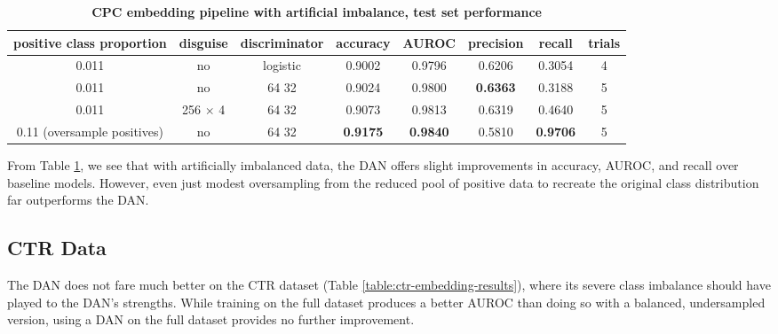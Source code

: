 \documentclass{proc}
\begin{document}
\begin{table}[]
\begin{center}
	\begin{tabular}{|c|c|c|c|c|c|c|c|}
		\hline
 		\textbf{positive class proportion} &  \textbf{disguise} & \textbf{discriminator} & \textbf{accuracy} & \textbf{AUROC} & \textbf{precision} & \textbf{recall} & \textbf{trials} \\ \hline
 		0.011 & no & logistic & 0.9002 & 0.9796 & 0.6206 & 0.3054 & 4\\ \hline
 		0.011 & no & 64 32 & 0.9024 & 0.9800 & \textbf{0.6363} & 0.3188 & 5 \\ \hline
 		0.011 & 256 $\times$ 4 & 64 32 & 0.9073 & 0.9813 & 0.6319 & 0.4640 & 5 \\ \hline
 		0.11 (oversample positives) & no & 64 32 & \textbf{0.9175} & \textbf{0.9840} & 0.5810 & \textbf{0.9706} & 5\\ \hline
	\end{tabular}
	\caption{\textbf{CPC embedding pipeline with artificial imbalance, test set performance}}
	\label{table:cpc-embedding-imbalanced-results}
\end{center}
\end{table}

From Table \ref{table:cpc-embedding-imbalanced-results}, we see that with artificially imbalanced data, the DAN offers slight improvements in accuracy, AUROC, and recall over baseline models. However, even just modest oversampling from the reduced pool of positive data to recreate the original class distribution far outperforms the DAN.

\subsection{CTR Data}

The DAN does not fare much better on the CTR dataset (Table \ref{table:ctr-embedding-results}), where its severe class imbalance should have played to the DAN's strengths. While training on the full dataset produces a better AUROC than doing so with a balanced, undersampled version, using a DAN on the full dataset provides no further improvement.
\end{document}
